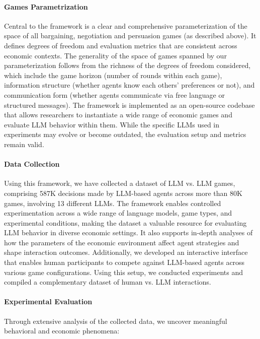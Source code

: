 \paragraph{Games Parametrization}
Central to the framework is a clear and comprehensive parameterization of the space of all bargaining, negotiation and persuasion games (as described above). It defines degrees of freedom and evaluation metrics that are consistent across economic contexts. 
The generality of the space of games spanned by our parameterization follows from the richness of the degrees of freedom considered, which include the game horizon (number of rounds within each game), information structure (whether agents know each others' preferences or not), and communication form (whether agents communicate via free language or structured messages).
The framework is implemented as an open-source codebase that allows researchers to instantiate a wide range of economic games and evaluate LLM behavior within them. While the specific LLMs used in experiments may evolve or become outdated, the evaluation setup and metrics remain valid. 

\paragraph{Data Collection}
Using this framework, we have collected a dataset of LLM vs. LLM games, comprising 587K decisions made by LLM-based agents across more than 80K games, involving 13 different LLMs. The framework enables controlled experimentation across a wide range of language models, game types, and experimental conditions, making the dataset a valuable resource for evaluating LLM behavior in diverse economic settings. It also supports in-depth analyses of how the parameters of the economic environment affect agent strategies and shape interaction outcomes. Additionally, we developed an interactive interface that enables human participants to compete against LLM-based agents across various game configurations. Using this setup, we conducted experiments and compiled a complementary dataset of human vs. LLM interactions.

\paragraph{Experimental Evaluation}
Through extensive analysis of the collected data, we uncover meaningful behavioral and economic phenomena:

